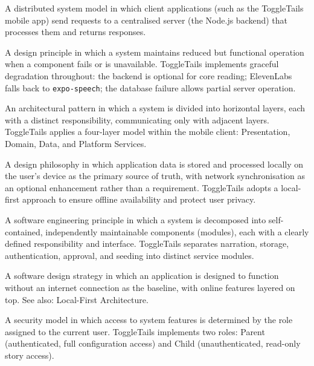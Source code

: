 \begin{description}[leftmargin=2.5cm, style=nextline]

\item[\textbf{Client--Server Architecture}]
A distributed system model in which client applications (such as the
ToggleTails mobile app) send requests to a centralised server (the Node.js
backend) that processes them and returns responses.

\item[\textbf{Graceful Degradation}]
A design principle in which a system maintains reduced but functional
operation when a component fails or is unavailable. ToggleTails implements
graceful degradation throughout: the backend is optional for core reading;
ElevenLabs falls back to \texttt{expo-speech}; the database failure allows
partial server operation.

\item[\textbf{Layered Architecture}]
An architectural pattern in which a system is divided into horizontal layers,
each with a distinct responsibility, communicating only with adjacent layers.
ToggleTails applies a four-layer model within the mobile client: Presentation,
Domain, Data, and Platform Services.

\item[\textbf{Local-First Architecture}]
A design philosophy in which application data is stored and processed
locally on the user's device as the primary source of truth, with network
synchronisation as an optional enhancement rather than a requirement.
ToggleTails adopts a local-first approach to ensure offline availability and
protect user privacy.

\item[\textbf{Modular Design}]
A software engineering principle in which a system is decomposed into
self-contained, independently maintainable components (modules), each with a
clearly defined responsibility and interface. ToggleTails separates
narration, storage, authentication, approval, and seeding into distinct
service modules.

\item[\textbf{Offline-First}]
A software design strategy in which an application is designed to function
without an internet connection as the baseline, with online features layered
on top. See also: Local-First Architecture.

\item[\textbf{Role-Based Access Control (RBAC)}]
A security model in which access to system features is determined by the role
assigned to the current user. ToggleTails implements two roles: Parent
(authenticated, full configuration access) and Child (unauthenticated,
read-only story access).


\end{description}
